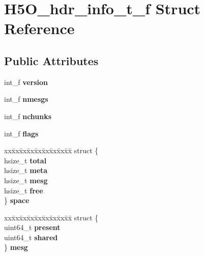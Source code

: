 \hypertarget{struct_h5_o__hdr__info__t__f}{}\section{H5\+O\+\_\+hdr\+\_\+info\+\_\+t\+\_\+f Struct Reference}
\label{struct_h5_o__hdr__info__t__f}
\subsection*{Public Attributes}
\begin{DoxyCompactItemize}
\item 
\mbox{\label{struct_h5_o__hdr__info__t__f_a8f108f4980c81e9e2e994cb33720dced}} 
int\+\_\+f {\bfseries version}
\item 
\mbox{\label{struct_h5_o__hdr__info__t__f_ae795c4113f0dd775941a9fb5e17f4768}} 
int\+\_\+f {\bfseries nmesgs}
\item 
\mbox{\label{struct_h5_o__hdr__info__t__f_ad3a8c32573238500b998605401734467}} 
int\+\_\+f {\bfseries nchunks}
\item 
\mbox{\label{struct_h5_o__hdr__info__t__f_a9a9747de120a6d2825cb7ff681c13f2d}} 
int\+\_\+f {\bfseries flags}
\item 
\mbox{\label{struct_h5_o__hdr__info__t__f_a99cc64185bf9a9eca250eff556eaa1c3}} 
\begin{tabbing}
xx\=xx\=xx\=xx\=xx\=xx\=xx\=xx\=xx\=\kill
struct \{\\
\>hsize\_t {\bfseries total}\\
\>hsize\_t {\bfseries meta}\\
\>hsize\_t {\bfseries mesg}\\
\>hsize\_t {\bfseries free}\\
\} {\bfseries space}\\

\end{tabbing}\item 
\mbox{\label{struct_h5_o__hdr__info__t__f_a72982c77148f16162c3c047be8eb4f63}} 
\begin{tabbing}
xx\=xx\=xx\=xx\=xx\=xx\=xx\=xx\=xx\=\kill
struct \{\\
\>uint64\_t {\bfseries present}\\
\>uint64\_t {\bfseries shared}\\
\} {\bfseries mesg}\\


\end{tabbing}
\end{DoxyCompactItemize}
